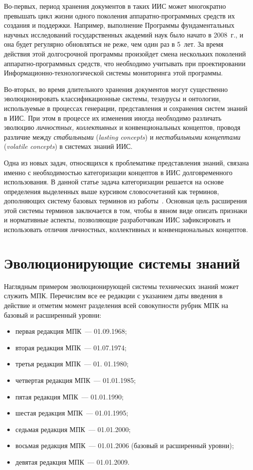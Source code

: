 \begin{multicols}{2}
{}

   Во-первых, период хранения документов в таких ИИС может многократно превышать
цикл жизни одного поколения аппаратно-программных средств их создания и поддержки.
Например, выполнение Программы фундаментальных научных исследований
государственных академий наук было начато в 2008~г., и она будет регулярно обновляться
не реже, чем один раз в 5~лет. За время действия этой долгосрочной программы произойдет
смена нескольких поколений аппаратно-программных средств, что необходимо учитывать
при проектировании Информационно-технологической системы мониторинга этой
программы.

   Во-вторых, во время длительного хранения документов могут существенно
эволюционировать классификационные системы, тезаурусы и онтологии, используемые в
процессах генерации, представления и сохранения систем знаний в ИИС. При этом в
процессе их изменения иногда необходимо различать эволюцию \textit{личностных,
коллективных} и конвенциональных концептов, проводя различие между
\textit{стабильными} (\textit{lasting concepts}) и \textit{нестабильными концептами}
(\textit{volatile concepts}) в системах знаний ИИС.

   Одна из новых задач, относящихся к проблематике представления знаний, связана
именно с необходимостью категоризации концептов в ИИС долговременного использования. В
данной статье задача категоризации решается на основе определения выделенных выше
курсивом словосочетаний как терминов, дополняющих систему базовых терминов из
работы~\cite{5za}. Основная цель расширения этой системы терминов заключается в том,
чтобы в явном виде описать признаки и нормативные аспекты, позволяющие разработчикам
ИИС зафиксировать и использовать отличия личностных, коллективных и
конвенциональных концептов.

\section{Эволюционирующие системы знаний}

   Наглядным примером эволюционирующей сис\-те\-мы технических знаний может служить
МПК. Перечислим все ее редакции с указанием
даты введения в действие и отметим момент разделения всей совокупности рубрик МПК на
базовый и расширенный уровни:
   \begin{itemize}
\item первая редакция МПК~--- 01.09.1968;
\item вторая редакция МПК~--- 01.07.1974;
\item третья редакция МПК~--- 01. 01.1980;
\item четвертая редакция МПК~--- 01.01.1985;
\item пятая редакция МПК~---  01.01.1990;
\item шестая редакция МПК~---  01.01.1995;
\item седьмая редакция МПК~---  01.01.2000;
\item восьмая редакция МПК~---  01.01.2006 (базовый и расширенный уровни);
\item девятая редакция МПК~---  01.01.2009.
\end{itemize}


\end{multicols}
